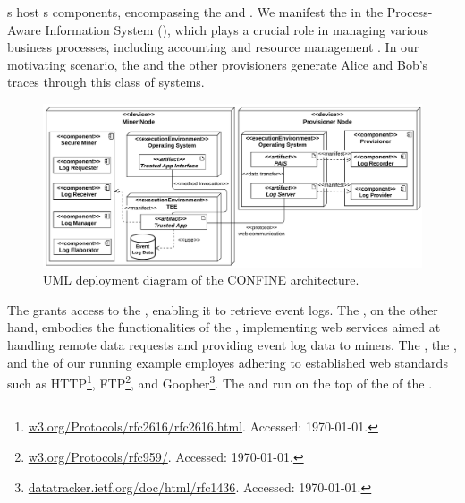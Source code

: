 s host s components, encompassing the  and . 
We manifest the  in the Process-Aware Information System (), which plays a crucial role in managing various business processes, including accounting and resource management \cite{Dumas.etal/2018:FundamentalsofBPM}. In our motivating scenario, the  and the other provisioners generate Alice and Bob's traces through this class of systems.
\begin{figure}[t]
	\centering
	\includegraphics[width=1\linewidth]{content/figures/deploymentdiagram.pdf}
	\caption{UML deployment diagram of the CONFINE architecture.}
	\label{fig:deployment_diagram}
\end{figure}
The  grants access to the , enabling it to retrieve event logs. The , on the other hand, embodies the functionalities of the , implementing web services aimed at handling remote data requests and providing event log data to miners. The , the , and the  of our running example employes  adhering to established web standards such as HTTP\footnote{\url{w3.org/Protocols/rfc2616/rfc2616.html}. Accessed: \today.}, FTP\footnote{\url{w3.org/Protocols/rfc959/}. Accessed: \today.}, and Goopher\footnote{\url{datatracker.ietf.org/doc/html/rfc1436}. Accessed: \today.}. The  and  run on the top of the  of the .

